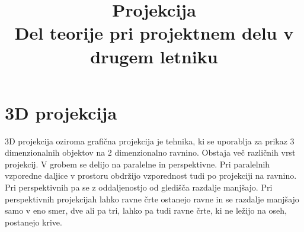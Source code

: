 \documentclass[a4paper, 12px]{article}
\title{Projekcija \\[1ex] \large Del teorije pri projektnem delu v drugem letniku}
\begin{document}
\maketitle
\tableofcontents

\section{3D projekcija}
    3D projekcija oziroma grafična projekcija je tehnika, ki se uporablja za prikaz 3 dimenzionalnih objektov na 
    2 dimenzionalno ravnino. Obstaja več različnih vrst projekcij. V grobem se delijo na paralelne 
    in perspektivne. Pri paralelnih vzporedne daljice v prostoru obdržijo vzporednost tudi po 
    projekciji na ravnino. Pri perspektivnih pa se z oddaljenostjo od gledišča razdalje manjšajo.
    Pri perspektivnih projekcijah lahko ravne črte ostanejo ravne in se razdalje manjšajo samo v 
    eno smer, dve ali pa tri, lahko pa tudi ravne črte, ki ne ležijo na oseh, postanejo krive.
    \cite{3D-projection}
\end{document}
